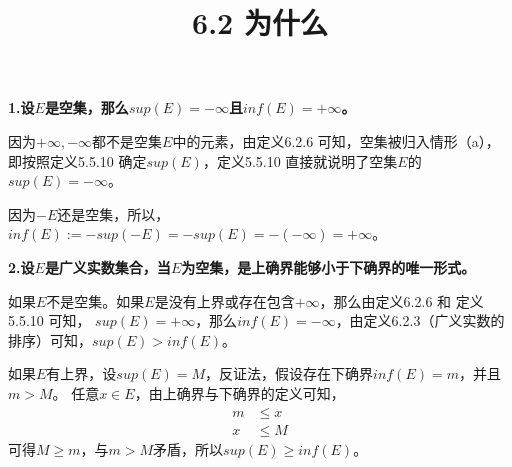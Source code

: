 \documentclass{article}
\theoremstyle{mystyle}
\begin{document}
\title{6.2 为什么}
\maketitle

\textbf{1.设$E$是空集，那么$sup(E)=-\infty$且$inf(E)=+\infty$。}

因为$+\infty, -\infty$都不是空集$E$中的元素，由定义6.2.6 可知，空集被归入情形（a），
即按照定义5.5.10 确定$sup(E)$，定义5.5.10 直接就说明了空集$E$的$sup(E)=-\infty$。


因为$-E$还是空集，所以，$inf(E) := -sup(-E) = -sup(E) = -(-\infty) = +\infty$。

\textbf{2.设$E$是广义实数集合，当$E$为空集，是上确界能够小于下确界的唯一形式。}

如果$E$不是空集。如果$E$是没有上界或存在包含$+\infty$，那么由定义6.2.6 和 定义5.5.10 可知，
$sup(E) = +\infty$，那么$inf(E) = -\infty$，由定义6.2.3（广义实数的排序）可知，$sup(E) > inf(E)$。

如果$E$有上界，设$sup(E) = M$，反证法，假设存在下确界$inf(E) = m$，并且$m > M$。
任意$x \in E$，由上确界与下确界的定义可知，
\begin{align}
  m & \leq x \\
  x & \leq M
\end{align}
可得$M \geq m$，与$m > M$矛盾，所以$sup(E) \geq inf(E)$。
\end{document}
